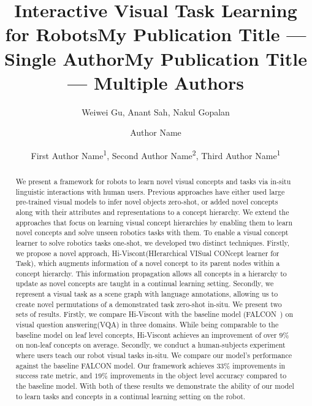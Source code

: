 \documentclass[letterpaper]{article} %
\title{Interactive Visual Task Learning for Robots}
\author{
    Weiwei Gu,
    Anant Sah,
    Nakul Gopalan
}
\title{My Publication Title --- Single Author}
\author {
    Author Name
}
\title{My Publication Title --- Multiple Authors}
\author {
    First Author Name\textsuperscript{\rm 1},
    Second Author Name\textsuperscript{\rm 2},
    Third Author Name\textsuperscript{\rm 1}
}
\newcommand{\wgnote}[1]{\textcolor{red}{\textbf{WG: #1}}}
\begin{document}
\maketitle


\begin{abstract}
We present a framework for robots to learn novel visual concepts and tasks via in-situ linguistic interactions with human users. Previous approaches have either used large pre-trained visual models to infer novel objects zero-shot, or added novel concepts along with their attributes and representations to a concept hierarchy. We extend the approaches that focus on learning visual concept hierarchies by enabling them to learn novel concepts and solve unseen robotics tasks with them.  To enable a visual concept learner to solve robotics tasks one-shot, we developed two distinct techniques.
Firstly, we propose a novel approach, Hi-Viscont(HIerarchical VISual CONcept learner for Task), which augments information of a novel concept to its parent nodes within a concept hierarchy.
This information propagation allows all concepts in a hierarchy to update as novel concepts are taught in a continual learning setting.
Secondly, we represent a visual task as a scene graph with language annotations, allowing us to create novel permutations of a demonstrated task zero-shot in-situ.
We present two sets of results.
Firstly, we compare Hi-Viscont with the baseline model (FALCON~\cite{mei2022falcon}) on visual question answering(VQA) in three domains.
While being comparable to the baseline model on leaf level concepts, Hi-Viscont achieves an improvement of over $9\%$ on non-leaf concepts on average.
Secondly, we conduct a human-subjects experiment where users teach our robot visual tasks in-situ. We compare our model’s performance against the baseline FALCON model.
Our framework achieves $33\%$ improvements in success rate metric, and $19\%$ improvements in the object level accuracy compared to the baseline model.
With both of these results we demonstrate the ability of our model to learn tasks and concepts in a continual learning setting on the robot.
\end{abstract}
\end{document}
